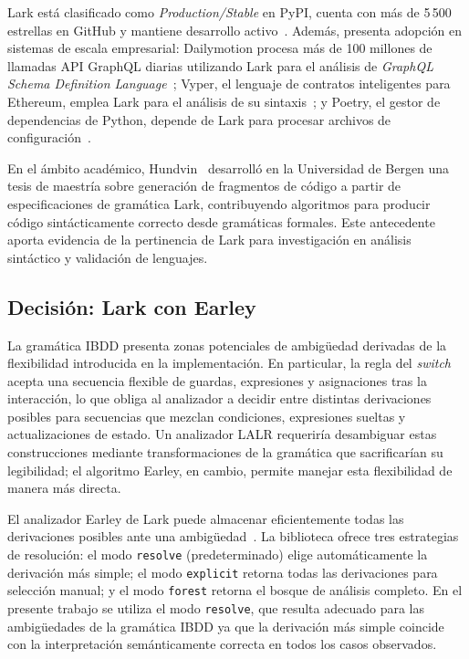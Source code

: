 Lark está clasificado como \textit{Production/Stable} en PyPI, cuenta con más de 5\,500 estrellas en GitHub y mantiene desarrollo activo~\cite{lark_pypi}. Además, presenta adopción en sistemas de escala empresarial: Dailymotion procesa más de 100 millones de llamadas API GraphQL diarias utilizando Lark para el análisis de \textit{GraphQL Schema Definition Language}~\cite{dailymotion_graphql}; Vyper, el lenguaje de contratos inteligentes para Ethereum, emplea Lark para el análisis de su sintaxis~\cite{vyper_github}; y Poetry, el gestor de dependencias de Python, depende de Lark para procesar archivos de configuración~\cite{poetry_github}.

En el ámbito académico, Hundvin~\cite{hundvin2022code} desarrolló en la Universidad de Bergen una tesis de maestría sobre generación de fragmentos de código a partir de especificaciones de gramática Lark, contribuyendo algoritmos para producir código sintácticamente correcto desde gramáticas formales. Este antecedente aporta evidencia de la pertinencia de Lark para investigación en análisis sintáctico y validación de lenguajes.

\subsection{Decisión: Lark con Earley}

La gramática IBDD presenta zonas potenciales de ambigüedad derivadas de la flexibilidad introducida en la implementación. En particular, la regla del \textit{switch} acepta una secuencia flexible de guardas, expresiones y asignaciones tras la interacción, lo que obliga al analizador a decidir entre distintas derivaciones posibles para secuencias que mezclan condiciones, expresiones sueltas y actualizaciones de estado. Un analizador LALR requeriría desambiguar estas construcciones mediante transformaciones de la gramática que sacrificarían su legibilidad; el algoritmo Earley, en cambio, permite manejar esta flexibilidad de manera más directa.

El analizador Earley de Lark puede almacenar eficientemente todas las derivaciones posibles ante una ambigüedad~\cite{lark_docs}. La biblioteca ofrece tres estrategias de resolución: el modo \texttt{resolve} (predeterminado) elige automáticamente la derivación más simple; el modo \texttt{explicit} retorna todas las derivaciones para selección manual; y el modo \texttt{forest} retorna el bosque de análisis completo. En el presente trabajo se utiliza el modo \texttt{resolve}, que resulta adecuado para las ambigüedades de la gramática IBDD ya que la derivación más simple coincide con la interpretación semánticamente correcta en todos los casos observados.

